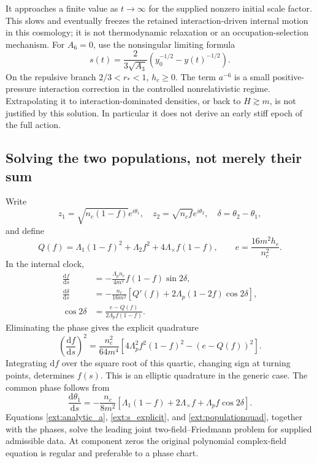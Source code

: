 \documentclass[11pt]{article}
\newcommand{\dd}{\mathrm d}
\begin{document}
It approaches a finite value as $t\to\infty$ for the supplied nonzero initial scale factor. This slows and eventually freezes the retained interaction-driven internal motion in this cosmology; it is not thermodynamic relaxation or an occupation-selection mechanism. For $A_6=0$, use the nonsingular limiting formula
\begin{equation}
 s(t)=\frac{2}{3\sqrt{A_3}}\left(y_0^{-1/2}-y(t)^{-1/2}\right).
\end{equation}
On the repulsive branch $2/3<r_*<1$, $h_c\ge0$. The term $a^{-6}$ is a small positive-pressure interaction correction in the controlled nonrelativistic regime. Extrapolating it to interaction-dominated densities, or back to $H\gtrsim m$, is not justified by this solution. In particular it does not derive an early stiff epoch of the full action.

\subsection{Solving the two populations, not merely their sum}
Write
\begin{equation}
 z_1=\sqrt{n_c(1-f)}e^{i\theta_1},\quad
 z_2=\sqrt{n_cf}e^{i\theta_2},\quad \delta=\theta_2-\theta_1,
\end{equation}
and define
\begin{equation}
 Q(f)=\Lambda_1(1-f)^2+\Lambda_2f^2+4\Lambda_\times f(1-f),
 \qquad e=\frac{16m^2h_c}{n_c^2}.
\end{equation}
In the internal clock,
\begin{align}
 \frac{\dd f}{\dd s}&=-\frac{\Lambda_pn_c}{4m^2}f(1-f)\sin2\delta,\\
 \frac{\dd\delta}{\dd s}&=-\frac{n_c}{16m^2}
       [Q'(f)+2\Lambda_p(1-2f)\cos2\delta],\\
 \cos2\delta&=\frac{e-Q(f)}{2\Lambda_p f(1-f)}.
\end{align}
Eliminating the phase gives the explicit quadrature
\begin{equation}
 \boxed{\left(\frac{\dd f}{\dd s}\right)^2
 =\frac{n_c^2}{64m^4}
 \left[4\Lambda_p^2f^2(1-f)^2-(e-Q(f))^2\right].}\label{ext:populationquad}
\end{equation}
Integrating $\dd f$ over the square root of this quartic, changing sign at turning points, determines $f(s)$. This is an elliptic quadrature in the generic case. The common phase follows from
\begin{equation}
 \frac{\dd\theta_1}{\dd s}=-\frac{n_c}{8m^2}
 [\Lambda_1(1-f)+2\Lambda_\times f+\Lambda_pf\cos2\delta].
\end{equation}
Equations \eqref{ext:analytic_a}, \eqref{ext:s_explicit}, and \eqref{ext:populationquad}, together with the phases, solve the leading joint two-field--Friedmann problem for supplied admissible data. At component zeros the original polynomial complex-field equation is regular and preferable to a phase chart.
\end{document}

